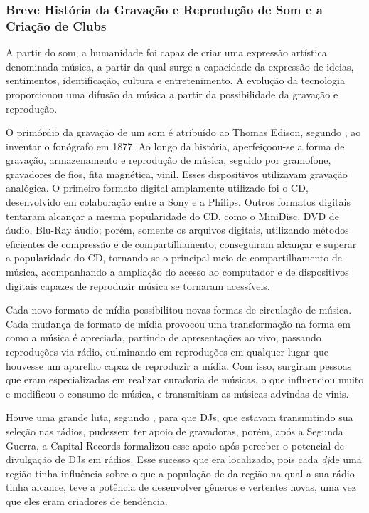 \subsubsection{Breve História da Gravação e Reprodução de Som e a Criação de Clubs}
A partir do som, a humanidade foi capaz de criar uma expressão artística denominada música, a partir da qual surge a capacidade da expressão de ideias, sentimentos, identificação, cultura e entretenimento. A evolução da tecnologia proporcionou uma difusão da música a partir da possibilidade da gravação e reprodução. 
\par
O primórdio da gravação de um som é atribuído ao Thomas Edison, segundo \cite{roads1996computer}, ao inventar o fonógrafo em 1877. Ao longo da história, aperfeiçoou-se a forma de gravação, armazenamento e reprodução de música, seguido por gramofone, gravadores de fios, fita magnética, vinil. Esses dispositivos utilizavam gravação analógica. O primeiro formato digital amplamente utilizado foi o CD, desenvolvido em colaboração entre a Sony e a Philips. Outros formatos digitais tentaram alcançar a mesma popularidade do CD, como o MiniDisc, DVD de áudio, Blu-Ray áudio; porém, somente os arquivos digitais, utilizando métodos eficientes de compressão e de compartilhamento, conseguiram alcançar e superar a popularidade do CD, tornando-se o principal meio de compartilhamento de música, acompanhando a ampliação do acesso ao computador e de dispositivos digitais capazes de reproduzir música se tornaram acessíveis. 
\par
Cada novo formato de mídia possibilitou novas formas de circulação de música. Cada mudança de formato de mídia provocou uma transformação na forma em como a música é apreciada, partindo de apresentações ao vivo, passando reproduções via rádio, culminando em reproduções em qualquer lugar que houvesse um aparelho capaz de reproduzir a mídia. Com isso, surgiram pessoas que eram especializadas em realizar curadoria de músicas, o que influenciou muito e modificou o consumo de música, e transmitiam as músicas advindas de vinis.
\par
Houve uma grande luta, segundo \cite{lastnight}, para que DJs, que estavam transmitindo sua seleção nas rádios, pudessem ter apoio de gravadoras, porém, após a Segunda Guerra, a Capital Records formalizou esse apoio após perceber o potencial de divulgação de DJs em rádios. Esse sucesso que era localizado, pois cada \textit{dj}de uma região tinha influência sobre o que a população de da região na qual a sua rádio tinha alcance, teve a potência de desenvolver gêneros e vertentes novas, uma vez que eles eram criadores de tendência. 
